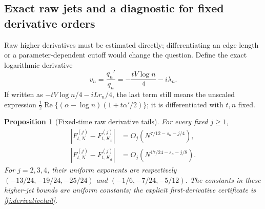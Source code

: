 \documentclass[11pt]{article}
\numberwithin{equation}{section}
\newtheorem{proposition}[theorem]{Proposition}
\theoremstyle{definition}
\theoremstyle{remark}
\DeclareMathOperator{\Rea}{Re}
\begin{document}
\subsection{Exact raw jets and a diagnostic for fixed derivative orders}

Raw higher derivatives must be estimated directly; differentiating an
edge length or a parameter-dependent cutoff would change the question.
Define the exact logarithmic derivative
\begin{equation}\label{lj:rawmultiplier}
 v_n=\frac{q_n'}{q_n}
       =-\frac{tV\log n}{4}-i\lambda_n.
\end{equation}
If written as \(-tV\log n/4-iLr_n/4\), the last term still means
the unscaled expression
\(\frac12\Rea\{(\alpha-\log n)(1+t\alpha'/2)\}\);
it is differentiated with \(t,n\) fixed.

\begin{proposition}[Fixed-time raw derivative tails]\label{lj:rawtails}
For every fixed \(j\ge1\),
\begin{align}
 |F_{t,N}^{(j)}-F_{t,K_v}^{(j)}|
    &=O_j(N^{7/12-s_\kappa-j/4}),\label{lj:shortjets}\\
 |F_{t,N}^{(j)}-F_{t,K_d}^{(j)}|
    &=O_j(N^{17/24-s_\kappa-j/8}).\label{lj:deepjets}
\end{align}
For \(j=2,3,4\), their uniform exponents are respectively
\((-13/24,-19/24,-25/24)\) and
\((-1/6,-7/24,-5/12)\).
The constants in these higher-jet bounds are uniform constants; the
explicit first-derivative certificate is
\eqref{lj:derivativetail}.
\end{proposition}
\end{document}
